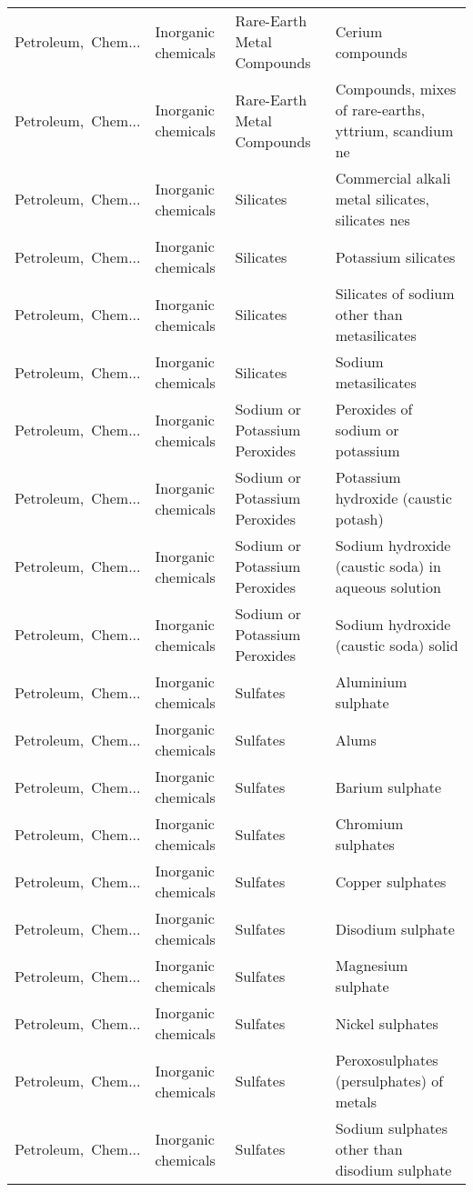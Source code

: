 \begin{appendices}
\begin{xltabular}{\textwidth}{|p{0.10\textwidth}|p{0.25\textwidth}|p{0.24\textwidth}|p{0.31\textwidth}|}
Petroleum,\ Chem... & Inorganic chemicals & Rare-Earth Metal Compounds & Cerium compounds \\
Petroleum,\ Chem... & Inorganic chemicals & Rare-Earth Metal Compounds & Compounds, mixes of rare-earths, yttrium, scandium ne \\
Petroleum,\ Chem... & Inorganic chemicals & Silicates & Commercial alkali metal silicates, silicates nes \\
Petroleum,\ Chem... & Inorganic chemicals & Silicates & Potassium silicates \\
Petroleum,\ Chem... & Inorganic chemicals & Silicates & Silicates of sodium other than metasilicates \\
Petroleum,\ Chem... & Inorganic chemicals & Silicates & Sodium metasilicates \\
Petroleum,\ Chem... & Inorganic chemicals & Sodium or Potassium Peroxides & Peroxides of sodium or potassium \\
Petroleum,\ Chem... & Inorganic chemicals & Sodium or Potassium Peroxides & Potassium hydroxide (caustic potash) \\
Petroleum,\ Chem... & Inorganic chemicals & Sodium or Potassium Peroxides & Sodium hydroxide (caustic soda) in aqueous solution \\
Petroleum,\ Chem... & Inorganic chemicals & Sodium or Potassium Peroxides & Sodium hydroxide (caustic soda) solid \\
Petroleum,\ Chem... & Inorganic chemicals & Sulfates & Aluminium sulphate \\
Petroleum,\ Chem... & Inorganic chemicals & Sulfates & Alums \\
Petroleum,\ Chem... & Inorganic chemicals & Sulfates & Barium sulphate \\
Petroleum,\ Chem... & Inorganic chemicals & Sulfates & Chromium sulphates \\
Petroleum,\ Chem... & Inorganic chemicals & Sulfates & Copper sulphates \\
Petroleum,\ Chem... & Inorganic chemicals & Sulfates & Disodium sulphate \\
Petroleum,\ Chem... & Inorganic chemicals & Sulfates & Magnesium sulphate \\
Petroleum,\ Chem... & Inorganic chemicals & Sulfates & Nickel sulphates \\
Petroleum,\ Chem... & Inorganic chemicals & Sulfates & Peroxosulphates (persulphates) of metals \\
Petroleum,\ Chem... & Inorganic chemicals & Sulfates & Sodium sulphates other than disodium sulphate \\

\end{xltabular}
\end{appendices}
